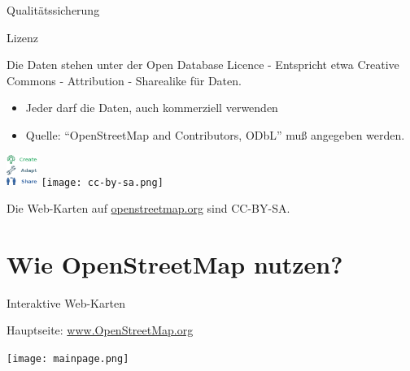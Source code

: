 \documentclass{beamer}
\begin{document}
\begin{frame}{Qualitätssicherung}

\end{frame}



\begin{frame}{Lizenz}

Die Daten stehen unter der Open Database Licence - Entspricht etwa Creative Commons - Attribution - Sharealike für Daten.
\begin{itemize}
  \item Jeder darf die Daten, auch kommerziell verwenden
  \item Quelle: "`OpenStreetMap and Contributors, ODbL"' muß angegeben werden.
\end{itemize}

 \begin{center}
 \includegraphics[width=1cm]{ODbL.png}
 \hspace{2cm}
 \texttt{[image: cc-by-sa.png]}
 \end{center}

\pause
Die Web-Karten auf \href{http://osm.org}{openstreetmap.org} sind CC-BY-SA.

\end{frame}

\section{Wie OpenStreetMap nutzen?}

\begin{frame}{Interaktive Web-Karten}

Hauptseite: \href{http://osm.org}{www.OpenStreetMap.org}

 \begin{center}
 \texttt{[image: mainpage.png]}
 \end{center}



\end{frame}
\end{document}
